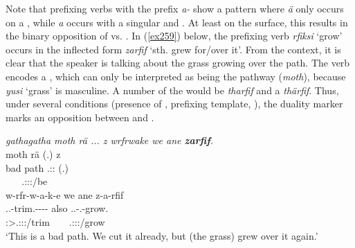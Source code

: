 Note that prefixing verbs with the  prefix \emph{a-} show a pattern where \emph{ä} only occurs on a , while \emph{a} occurs with a singular and  . At least on the surface, this results in the binary opposition of  vs. . In (\ref{ex259}) below, the prefixing verb \emph{rfiksi} `grow' occurs in the inflected form \emph{zarfif} `sth. grew for/over it'. From the context, it is clear that the speaker is talking about the grass growing over the path. The verb encodes a  , which can only be interpreted as being the pathway (\emph{moth}), because \emph{yusi} `grass' is masculine. A  number of the  would be \emph{tharfif} and a  \emph{thärfif}. Thus, under several conditions (presence of , prefixing template, ), the duality marker marks an opposition between  and .

\begin{exe}
	\ex \emph{gathagatha moth rä ... z wrfrwake we ane \textbf{zarfif}.}\\
	 moth rä (.) z\\
	bad path \Tsg.\F:\Cop:\Ndu{} (.) \Iam{}\\
	~ ~ {\Tsg.\F:\Sbj:\Nonpast:\Ipfv/be} ~ ~\\
	\sn
	\glll w-rfr-w-a-k-e we ane z-a-rfif\\
	\Tsg.\F.\Alph-trim.\Ext-\Ndu-\Pst-\Lk-\Fnsg{} also \Dem{} \Tsg.\F.\Gam-\Ndu.\Vc-grow.\Rs\\
	\footnotesize{\Fpl:\Sbj>\Tsg.\F:\Obj:\Pst:\Ipfv/trim} ~ ~ {\Tsg.\F:\Io:\Rpst:\Pfv/grow}\\
	\trans `This is a bad path. We cut it already, but (the grass) grew over it again.'\\ 
	\label{ex259}
\end{exe}

